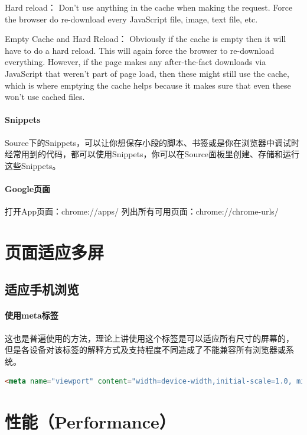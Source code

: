 \documentclass{book}
\begin{document}
Hard reload：
Don't use anything in the cache when making the request. Force the browser do re-download every JavaScript file, image, text file, etc.

Empty Cache and Hard Reload：
Obviously if the cache is empty then it will have to do a hard reload. This will again force the browser to re-download everything. 
However, if the page makes any after-the-fact downloads via JavaScript that weren't part of page load, then these might still use the cache, 
which is where emptying the cache helps because it makes sure that even these won't use cached files.

\paragraph{Snippets}
Source下的Snippets，可以让你想保存小段的脚本、书签或是你在浏览器中调试时经常用到的代码，都可以使用Snippets，你可以在Source面板里创建、存储和运行这些Snippets。

\paragraph{Google页面}

打开App页面：chrome://apps/
列出所有可用页面：chrome://chrome-urls/

\section{页面适应多屏}

\subsection{适应手机浏览}

\paragraph{使用meta标签}这也是普遍使用的方法，理论上讲使用这个标签是可以适应所有尺寸的屏幕的，
但是各设备对该标签的解释方式及支持程度不同造成了不能兼容所有浏览器或系统。

\begin{lstlisting}[language=HTML]
<meta name="viewport" content="width=device-width,initial-scale=1.0, minimum-scale=1.0, maximum-scale=1.0, user-scalable=no"/>
\end{lstlisting}



\section{性能（Performance）}
\end{document}
